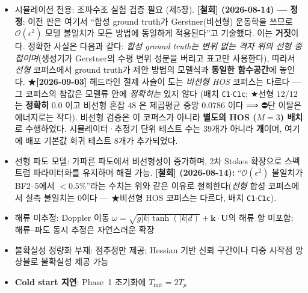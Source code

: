 \documentclass[11pt]{report}
\numberwithin{equation}{chapter}
\numberwithin{figure}{chapter}
\numberwithin{table}{chapter}
\begin{document}
\begin{itemize}
  \item 시뮬레이션 전용: 조파수조 실험 검증 필요 (제5장).
        \textbf{[철회] (2026-08-14) --- 정정}: 이전 판은 여기서 ``합성 ground truth가
        Gerstner(비선형) 운동학을 쓰므로 $\mathcal{O}(\epsilon^2)$ 모델 불일치가 모든
        방법에 동일하게 적용된다''고 기술했다. 이는 \textbf{거짓}이다.
        정확한 사실은 다음과 같다: \emph{합성 ground truth는 변위 없는 격자 위의
        선형 중첩이며}(생성기가 Gerstner의 수평 변위 성분을 버리고 표고만 사용한다),
        따라서 \emph{선형} 코퍼스에서 ground truth가 제안 방법의 모델식과 \textbf{동일한
함수공간}에 놓인다. ★\textbf{[2026-09-03]} 헤드라인 절제 사슬이 도는 \emph{비선형 HOS}
코퍼스는 다르다 --- 그 코퍼스의 참값은 모델류 안에 \emph{정확히는} 있지 않다
(배치 \texttt{C1}$\cdot$\texttt{C1c}; ★선형 $12/12$ 는 \textbf{정확히} $0.0$ 이고
비선형 혼잡 $48$ 은 제곱평균 중앙 $\mathbf{0.0786}$ 이다 ⟹ ⛔단 이탈은 에너지로는 작다).
        비선형 검증은 이 코퍼스가 아니라 \textbf{별도의 HOS ($M{=}3$) 배치}로 수행하였다.
        시뮬레이터·추정기 단위 테스트 수는 39개가 아니라 \textbf{\DeployNumTests 개}이며,
        여기에 배포 기본값 회귀 테스트 8개가 추가되었다.
  \item 선형 파도 모델: 가파른 파도에서 비선형성이 증가하며,
        2차 Stokes 확장으로 스펙트럼 파라미터화를 유지하며 해결 가능.
        \textbf{[철회] (2026-08-14):} ``$\mathcal{O}(\epsilon^2)$ 불일치가 BF2--5에서
        $<0.5\%$''라는 수치는 위와 같은 이유로 철회한다(\emph{선형} 합성 코퍼스에서 실측 불일치는 0이다 --- ★비선형 HOS 코퍼스는
다르다, 배치 \texttt{C1}$\cdot$\texttt{C1c}).
  \item 해류 미추정: Doppler 이동
        $\omega = \sqrt{g|k|\tanh(|k|d)} + \mathbf{k}\cdot\mathbf{U}$의 해류 항 미포함;
        해류--파도 동시 추정은 자연스러운 확장
  \item 불확실성 정량화 부재: 점추정만 제공; Hessian 기반 신뢰 구간이나
        다중 시작점 앙상블로 불확실성 제공 가능
  \item \textbf{Cold start 지연}: Phase~1 초기화에 $T_{\text{init}} = 2T_p$

\end{itemize}
\end{document}
